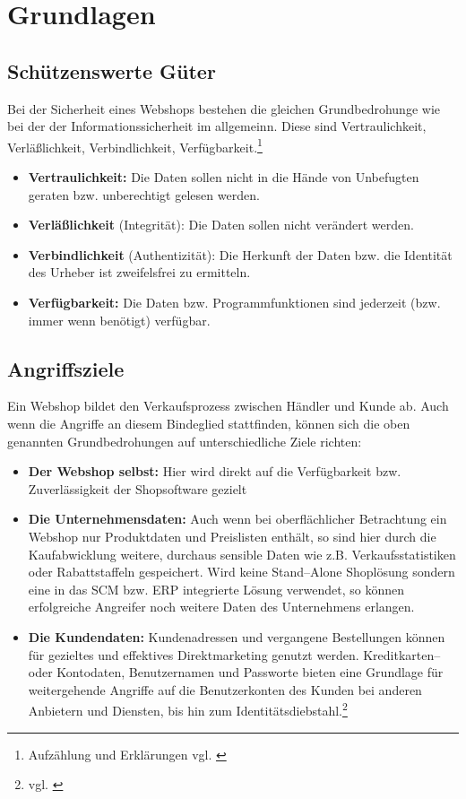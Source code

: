 \section{Grundlagen}
\label{sec:grundlagen}

\subsection{Schützenswerte Güter}

Bei der Sicherheit eines Webshops bestehen die gleichen Grundbedrohunge wie bei der der Informationssicherheit im allgemeinn. Diese sind 
Vertraulichkeit, Verläßlichkeit, Verbindlichkeit, Verfügbarkeit.\footnote{Aufzählung und Erklärungen vgl. \cite{bbds}}

\begin{itemize}
	\item \textbf{Vertraulichkeit:} Die Daten sollen nicht in die Hände von Unbefugten geraten bzw. unberechtigt gelesen werden.
	\item \textbf{Verläßlichkeit} (Integrität): Die Daten sollen nicht verändert werden.
	\item \textbf{Verbindlichkeit} (Authentizität): Die Herkunft der Daten bzw. die Identität des Urheber ist zweifelsfrei zu ermitteln.
	\item \textbf{Verfügbarkeit:} Die Daten bzw. Programmfunktionen sind jederzeit (bzw. immer wenn benötigt) verfügbar. 
\end{itemize}


\subsection{Angriffsziele}

Ein Webshop bildet den Verkaufsprozess zwischen Händler und Kunde ab. Auch wenn die Angriffe an diesem Bindeglied stattfinden, können sich 
die oben genannten Grundbedrohungen auf unterschiedliche Ziele richten:

\begin{itemize}
	\item \textbf{Der Webshop selbst:} Hier wird direkt auf die Verfügbarkeit bzw. Zuverlässigkeit der Shopsoftware gezielt
	\item \textbf{Die Unternehmensdaten:} Auch wenn bei oberflächlicher Betrachtung ein Webshop nur Produktdaten und Preislisten enthält, so sind hier durch die Kaufabwicklung weitere, durchaus sensible Daten wie z.B. Verkaufsstatistiken oder Rabattstaffeln gespeichert. Wird keine Stand--Alone Shoplösung sondern eine in das \ac{SCM} bzw. \ac{ERP} integrierte Lösung verwendet, so können erfolgreiche Angreifer noch weitere Daten des Unternehmens erlangen.  
	\item \textbf{Die Kundendaten:} Kundenadressen und vergangene Bestellungen können für gezieltes und effektives Direktmarketing genutzt werden. Kreditkarten-- oder Kontodaten, Benutzernamen und Passworte bieten eine Grundlage für weitergehende Angriffe auf die Benutzerkonten des Kunden bei anderen Anbietern und Diensten, bis hin zum Identitätsdiebstahl.\footnote{vgl. \cite{vodafone}}
\end{itemize}


